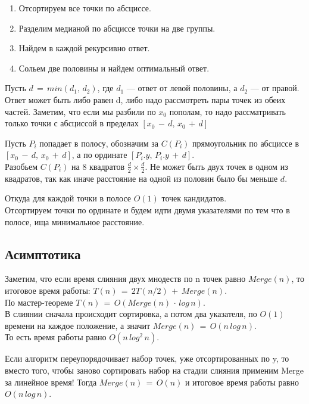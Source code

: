 \Alg

\begin{enumerate}
    \item Отсортируем все точки по абсциссе.
    \item Разделим медианой по абсциссе точки на две группы.
    \item Найдем в каждой рекурсивно ответ.
    \item Сольем две половины и найдем оптимальный ответ.
\end{enumerate}

Пусть $d\,=\,min(d_1,\,d_2)$, где $d_1$ — ответ от левой половины, а $d_2$ — от правой.
Ответ может быть либо равен d, либо надо рассмотреть пары точек из обеих частей.
Заметим, что если мы разбили по $x_0$ пополам, то надо рассматривать только точки с абсциссой в пределах $[x_0\,-\,d,\,x_0\,+\,d]$

Пусть $P_i$ попадает в полосу, обозначим за $C(P_i)$ прямоугольник по
абсциссе в $[x_0\,-\,d,\,x_0\,+\,d]$, а по ординате $[P_i.y,\,P_i.y\,+\,d]$.\\
Разобьем $C(P_i)$ на 8 квадратов $\frac{d}{2} \times \frac{d}{2}$. Не может быть двух точек в одном из квадратов, так как иначе расстояние на одной из половин было бы меньше $d$.


Откуда для каждой точки в полосе $O(1)$ точек кандидатов.\\
Отсортируем точки по ординате и будем идти двумя указателями по
тем что в полосе, ища минимальное расстояние.

\subsection*{Асимптотика}

Заметим, что если время слияния двух мнодеств по n точек равно $Merge(n)$, то итоговое время работы: $T(n)\,=\,2T(n/2)\,+\,Merge(n)$.\\
По мастер-теореме $T(n)\,=\,O(Merge(n)\, \cdot \,log\,n)$.\\
В слиянии сначала происходит сортировка, а потом два указателя, по
$O(1)$ времени на каждое положение, а значит $Merge(n)\,=\,O(n\,log\,n)$.\\
То есть время работы равно $O(n\,log^2\,n)$.

\Note Если алгоритм переупорядочивает набор точек, уже отсортированных
по y, то вместо того, чтобы заново сортировать набор на стадии слияния применим Merge за линейное время!
Тогда $Merge(n)\,=\,O(n)$ и итоговое время работы равно $O(n\,log\,n)$.

\pagebreak